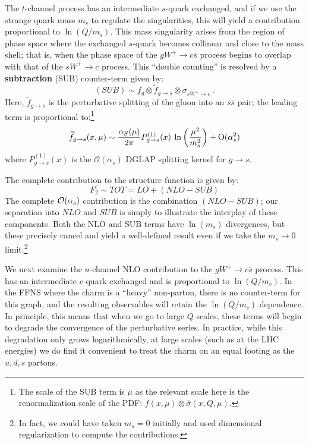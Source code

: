 %
The $t$-channel process has an intermediate $s$-quark exchanged, and
if we use the strange quark mass $m_{s}$ to regulate the
singularities, this will yield a contribution proportional to
$\ln(Q/m_{s})$. This mass singularity arises from the region of phase
space where the exchanged $s$-quark becomes collinear and close to the
mass shell; that is, when the phase space of the
\mbox{$gW^{+}\to c\bar{s}$} process begins to overlap with that of the
\mbox{$sW^{+}\to c$} process. This ``double counting'' is resolved by
a \textbf{subtraction} (SUB) counter-term
given by:
\[
(SUB)\sim f_{g}\otimes\widetilde{f}_{g\to s}\otimes\sigma_{sW^{+}\to
  c}\,.
\]
Here, $\widetilde{f}_{g\to s}$ is the perturbative splitting of the
gluon into an $s\bar{s}$ pair; the leading term is proportional
to:\footnote{The scale of the SUB term is $\mu$ as the relevant scale
  here is the renormalization scale of the PDF:
  $f(x,\mu)\otimes\hat{\sigma}(x,Q,\mu)$.}
\[
\widetilde{f}_{g\to s}(x,\mu)\sim\frac{\alpha_{S}(\mu)}{2\pi}P_{g\to
  s}^{(1)}(x)\:\ln\left(\frac{\mu^{2}}{m_{s}^{2}}\right)+\text{{\cal
    O}}(\alpha_{s}^{2})
\]
where $P_{g\to s}^{(1)}(x)$ is the $\mathcal{O}(\alpha_{s})$ DGLAP
splitting kernel for \hbox{$g\to s$}.

The complete contribution to the structure function is given by:
\[
F_{2}^{c}\sim TOT=LO+(NLO-SUB)
\]
The complete ${\cal O}(\alpha_{s})$ contribution is the combination
$(NLO-SUB)$; our separation into $NLO$ and $SUB$ is simply to
illustrate the interplay of these components. Both the NLO and SUB
terms have $\ln(m_{s})$ divergences, but these precisely cancel and
yield a well-defined result even if we take the $m_{s}\to 0$
limit.\footnote{In fact, we could have taken $m_{s}=0$ initially and
  used dimensional regularization to compute the contributions.}

%
We next examine the $u$-channel NLO contribution to the
\mbox{$gW^{+}\to c\bar{s}$} process. This has an intermediate
$c$-quark exchanged and is proportional to $\ln(Q/m_{c})$. In the FFNS
where the charm is a ``heavy'' non-parton, there is no counter-term
for this graph, and the resulting observables will retain the
$\ln(Q/m_{c})$ dependence. In principle, this means that when we go to
large $Q$ scales, these terms will begin to degrade the convergence of
the perturbative series. In practice, while this degradation only
grows logarithmically, at large scales (such as at the LHC energies)
we do find it convenient to treat the charm on an equal footing as the
${u,d,s}$ partons.

